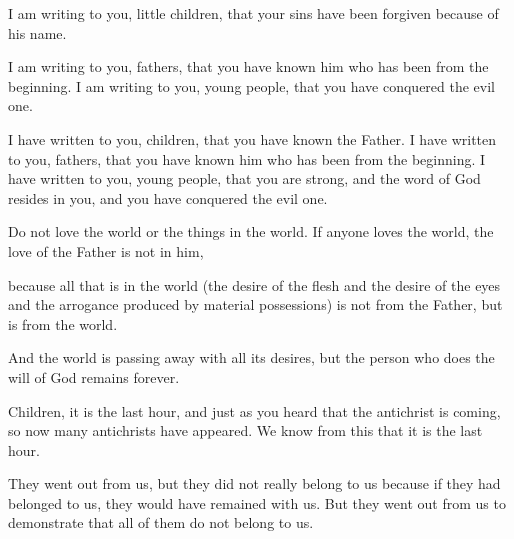 \begin{scripture}
 I am writing to you, little children, that your sins have been forgiven because of his name.
 I am writing to you, fathers, that you have known him who has been from the beginning. I am writing to you, young people, that you have conquered the evil one.
 I have written to you, children, that you have known the Father. I have written to you, fathers, that you have known him who has been from the beginning. I have written to you, young people, that you are strong, and the word of God resides in you, and you have conquered the evil one.
\everypar{}

 Do not love the world or the things in the world. If anyone loves the world, the love of the Father is not in him,
 because all that is in the world (the desire of the flesh and the desire of the eyes and the arrogance produced by material possessions) is not from the Father, but is from the world.
 And the world is passing away with all its desires, but the person who does the will of God remains forever.
\everypar{}

 Children, it is the last hour, and just as you heard that the antichrist is coming, so now many antichrists have appeared. We know from this that it is the last hour.
 They went out from us, but they did not really belong to us because if they had belonged to us, they would have remained with us. But they went out from us to demonstrate that all of them do not belong to us.
\everypar{}


\end{scripture}

